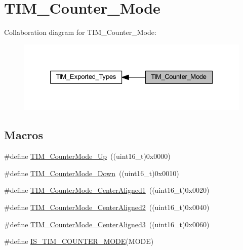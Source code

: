 \hypertarget{group___t_i_m___counter___mode}{}\section{T\+I\+M\+\_\+\+Counter\+\_\+\+Mode}
\label{group___t_i_m___counter___mode}
Collaboration diagram for T\+I\+M\+\_\+\+Counter\+\_\+\+Mode\+:
\nopagebreak
\begin{figure}[H]
\begin{center}
\leavevmode
\includegraphics[width=325pt]{group___t_i_m___counter___mode}
\end{center}
\end{figure}
\subsection*{Macros}
\begin{DoxyCompactItemize}
\item 
\#define \hyperlink{group___t_i_m___counter___mode_gaf4cd3ce74af3122507b77c8f6e79c832}{T\+I\+M\+\_\+\+Counter\+Mode\+\_\+\+Up}~((uint16\+\_\+t)0x0000)
\item 
\#define \hyperlink{group___t_i_m___counter___mode_gadd7c4200d185bdcd9e64ae80e6b200b0}{T\+I\+M\+\_\+\+Counter\+Mode\+\_\+\+Down}~((uint16\+\_\+t)0x0010)
\item 
\#define \hyperlink{group___t_i_m___counter___mode_gac07392e9637f8a0d115d4ba9a002ae93}{T\+I\+M\+\_\+\+Counter\+Mode\+\_\+\+Center\+Aligned1}~((uint16\+\_\+t)0x0020)
\item 
\#define \hyperlink{group___t_i_m___counter___mode_ga3793122e4c123a99e46fc2f04acea0d4}{T\+I\+M\+\_\+\+Counter\+Mode\+\_\+\+Center\+Aligned2}~((uint16\+\_\+t)0x0040)
\item 
\#define \hyperlink{group___t_i_m___counter___mode_ga65d9bc01ffa287cd7cf200d08c20a1ce}{T\+I\+M\+\_\+\+Counter\+Mode\+\_\+\+Center\+Aligned3}~((uint16\+\_\+t)0x0060)
\item 
\#define \hyperlink{group___t_i_m___counter___mode_ga9543fec190793e800d5d1b1b853636f5}{I\+S\+\_\+\+T\+I\+M\+\_\+\+C\+O\+U\+N\+T\+E\+R\+\_\+\+M\+O\+DE}(M\+O\+DE)
\end{DoxyCompactItemize}


